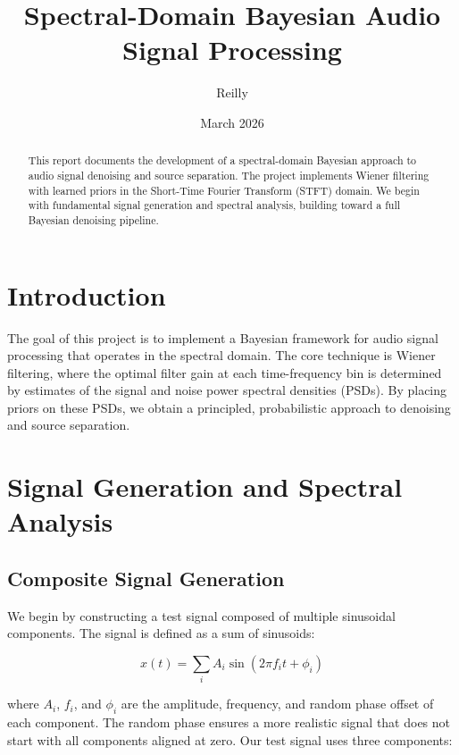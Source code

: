 \documentclass[12pt,a4paper]{article}
\title{Spectral-Domain Bayesian Audio Signal Processing}
\author{Reilly}
\date{March 2026}
\begin{document}
\maketitle

\begin{abstract}
This report documents the development of a spectral-domain Bayesian approach to audio signal denoising and source separation. The project implements Wiener filtering with learned priors in the Short-Time Fourier Transform (STFT) domain. We begin with fundamental signal generation and spectral analysis, building toward a full Bayesian denoising pipeline.
\end{abstract}

\tableofcontents
\newpage

\section{Introduction}

The goal of this project is to implement a Bayesian framework for audio signal processing that operates in the spectral domain. The core technique is Wiener filtering, where the optimal filter gain at each time-frequency bin is determined by estimates of the signal and noise power spectral densities (PSDs). By placing priors on these PSDs, we obtain a principled, probabilistic approach to denoising and source separation.

\section{Signal Generation and Spectral Analysis}

\subsection{Composite Signal Generation}

We begin by constructing a test signal composed of multiple sinusoidal components. The signal is defined as a sum of sinusoids:

\begin{equation}
    x(t) = \sum_{i} A_i \sin(2\pi f_i t + \phi_i)
\end{equation}

where $A_i$, $f_i$, and $\phi_i$ are the amplitude, frequency, and random phase offset of each component. The random phase ensures a more realistic signal that does not start with all components aligned at zero. Our test signal uses three components:
\end{document}
